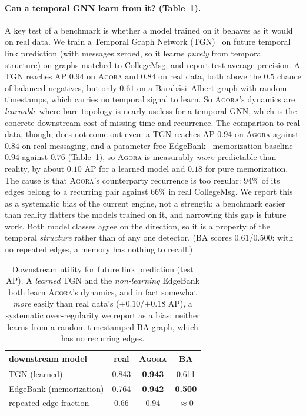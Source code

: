 \documentclass[sigconf,review,anonymous]{acmart}
\newcommand{\sys}{\textsc{Agora}\xspace}
\begin{document}
\paragraph{Can a temporal GNN learn from it? (Table~\ref{tab:downstream}).}
A key test of a benchmark is whether a model trained on it behaves as it
would on real data. We train a Temporal Graph Network
(TGN)~\cite{rossi2020tgn} on future temporal link prediction (with messages zeroed,
so it learns \emph{purely} from temporal structure) on graphs matched to
CollegeMsg, and report test average precision. A TGN reaches AP $0.94$ on \sys{} and
$0.84$ on real data, both above the $0.5$ chance of balanced negatives, but only
$0.61$ on a Barab\'asi--Albert graph with random timestamps, which carries no
temporal signal to learn. So \sys{}'s dynamics are \emph{learnable} where bare topology
is nearly useless for a temporal GNN, which is the concrete downstream cost of missing
time and recurrence. The comparison to real data, though, does not come out even: a TGN
reaches AP $0.94$ on \sys{} against $0.84$ on real messaging, and a parameter-free
EdgeBank~\cite{poursafaei2022edgebank} memorization baseline $0.94$ against $0.76$
(Table~\ref{tab:downstream}), so \sys{} is measurably \emph{more} predictable than
reality, by about $0.10$ AP for a learned model and $0.18$ for pure memorization. The
cause is that \sys{}'s counterparty recurrence is too regular: $94\%$ of its edges belong
to a recurring pair against $66\%$ in real CollegeMsg. We report this as a systematic
bias of the current engine, not a strength; a benchmark easier than reality flatters the
models trained on it, and narrowing this gap is future work. Both model classes agree on
the direction, so it is a property of the temporal \emph{structure} rather than of any
one detector. (BA scores $0.61$/$0.500$: with no repeated edges, a memory has nothing to
recall.)


\begin{table}[t]
\caption{Downstream utility for future link prediction (test AP). A \emph{learned} TGN
and the \emph{non-learning} EdgeBank both learn \sys{}'s dynamics, and in fact somewhat
\emph{more} easily than real data's ($+0.10$/$+0.18$ AP), a systematic over-regularity we
report as a bias; neither learns from a random-timestamped BA graph, which has no
recurring edges.}
\label{tab:downstream}
\small\centering
\begin{tabular}{@{}lccc@{}}
\toprule
downstream model & real & \sys{} & BA \\
\midrule
TGN (learned) & 0.843 & \textbf{0.943} & 0.611 \\
EdgeBank (memorization) & 0.764 & \textbf{0.942} & \textbf{0.500} \\
\midrule
repeated-edge fraction & 0.66 & 0.94 & $\approx\!0$ \\
\bottomrule
\end{tabular}
\end{table}
\end{document}
